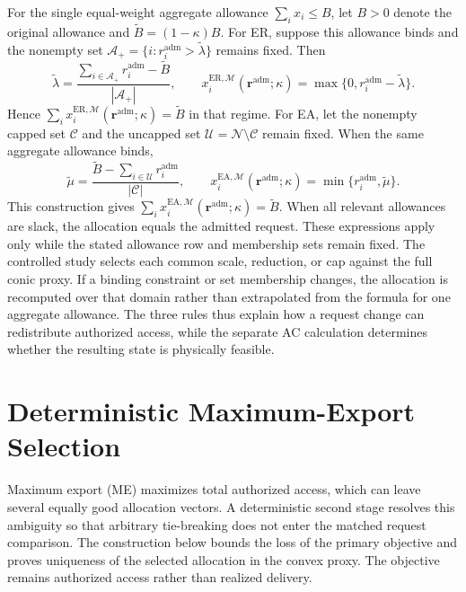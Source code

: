 \documentclass[11pt]{article}
\begin{document}
For the single equal-weight aggregate allowance
$\sum_i x_i\le B$, let $B>0$ denote the original allowance and
$\tilde B=(1-\kappa)B$. For ER, suppose this allowance binds and the
nonempty set
$\mathcal A_+=\{i:r_i^{\mathrm{adm}}>\tilde\lambda\}$ remains fixed.
Then
\begin{equation}
\tilde\lambda=
\frac{\sum_{i\in\mathcal A_+}r_i^{\mathrm{adm}}-\tilde B}
{|\mathcal A_+|},
\qquad
x_i^{\mathrm{ER},\mathcal M}(\mathbf r^{\mathrm{adm}};\kappa)
=\max\{0,r_i^{\mathrm{adm}}-\tilde\lambda\}.
\label{eq:supp_er_equal_allowance}
\end{equation}
Hence $\sum_i x_i^{\mathrm{ER},\mathcal M}(\mathbf r^{\mathrm{adm}};\kappa)=\tilde B$ in
that regime. For EA, let the nonempty capped set $\mathcal C$ and the uncapped
set $\mathcal U=\mathcal N\setminus\mathcal C$ remain fixed. When the same
aggregate allowance binds,
\begin{equation}
\tilde\mu=
\frac{\tilde B-\sum_{i\in\mathcal U}r_i^{\mathrm{adm}}}
{|\mathcal C|},
\qquad
x_i^{\mathrm{EA},\mathcal M}(\mathbf r^{\mathrm{adm}};\kappa)
=\min\{r_i^{\mathrm{adm}},\tilde\mu\}.
\label{eq:supp_ea_equal_allowance}
\end{equation}
This construction gives
$\sum_i x_i^{\mathrm{EA},\mathcal M}(\mathbf r^{\mathrm{adm}};\kappa)=\tilde B$.
When all relevant allowances are slack, the allocation equals the admitted
request. These expressions apply only while the stated allowance row and
membership sets remain fixed. The controlled study selects each common scale,
reduction, or cap against the full conic proxy. If a binding constraint or set
membership changes, the allocation is recomputed over that domain rather than
extrapolated from the formula for one aggregate allowance. The three rules thus
explain how a request change can redistribute authorized access, while the
separate AC calculation determines whether the resulting state is physically
feasible.

\section{Deterministic Maximum-Export Selection}
\label{supp:max_export_hierarchy}

Maximum export (ME) maximizes total authorized access, which can leave several
equally good allocation vectors. A deterministic second stage resolves this
ambiguity so that arbitrary tie-breaking does not enter the matched request
comparison. The construction below bounds the loss of the primary objective
and proves uniqueness of the selected allocation in the convex proxy. The
objective remains authorized access rather than realized delivery.
\end{document}
